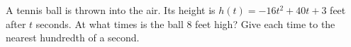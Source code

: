 A tennis ball is thrown into the air. Its height is $h(t)=-16t^2+40t+3$ feet after $t$ seconds. At what times is the ball $8$ feet high? Give each time to the nearest hundredth of a second.
